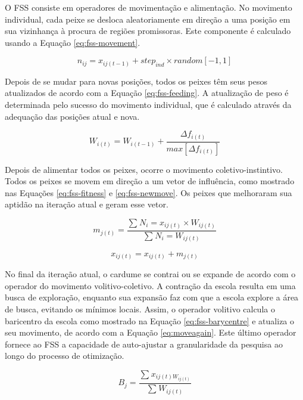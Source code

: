 O FSS consiste em operadores de movimentação e alimentação. No movimento individual, cada peixe se desloca aleatoriamente em direção a uma posição em sua vizinhança à procura de regiões promissoras. Este componente é calculado usando a Equação \ref{eq:fss-movement}.

\begin{equation} \label{eq:fss-movement}
    n_{ij} = x_{ij(t-1)} + step_{ind} \times random[-1,1]
\end{equation}

Depois de se mudar para novas posições, todos os peixes têm seus pesos atualizados de acordo com a Equação \ref{eq:fss-feeding}. A atualização de peso é determinada pelo sucesso do movimento individual, que é calculado através da adequação das posições atual e nova.

\begin{equation} \label{eq:fss-feeding}
    W_{i(t)} = W_{i(t-1)} + \frac{\Delta f_{i(t)}}{max[\Delta f_{i(t)}]}
\end{equation}

Depois de alimentar todos os peixes, ocorre o movimento coletivo-instintivo. Todos os peixes se movem em direção a um vetor de influência, como mostrado nas Equações \ref{eq:fss-fitness} e \ref{eq:fss-newmove}. Os peixes que melhoraram sua aptidão na iteração atual e geram esse vetor.

\begin{equation} \label{eq:fss-fitness}
    m_{j(t)} = \frac{\sum_{}^{} N_i = x_{ij(t)} \times W_{ij(t)}}{\sum_{}^{} N_i = W_{ij(t)}}
\end{equation}

\begin{equation} \label{eq:fss-newmove}
    x_{ij(t)} = x_{ij(t)} + m_{j(t)}
\end{equation}

No final da iteração atual, o cardume se contrai ou se expande de acordo com o operador do movimento volitivo-coletivo. A contração da escola resulta em uma busca de exploração, enquanto sua expansão faz com que a escola explore a área de busca, evitando os mínimos locais. Assim, o operador volitivo calcula o baricentro da escola como mostrado na Equação \ref{eq:fss-barycentre} e atualiza o seu movimento, de acordo com a Equação \ref{eq:moveagain}. Este último operador fornece ao FSS a capacidade de auto-ajustar a granularidade da pesquisa ao longo do processo de otimização.

\begin{equation} \label{eq:fss-barycentre}
    B_j = \frac{\sum_{}^{} x_{ij(t)W_{ij(t)}}}{\sum_{}^{} W_{ij(t)}}
\end{equation}

